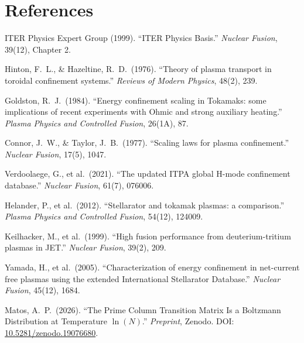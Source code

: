 \documentclass[11pt,letterpaper]{article}
\begin{document}
\section*{References}

\begin{enumerate}[label={[\arabic*]}]
\item ITER Physics Expert Group (1999). ``ITER Physics Basis.'' \textit{Nuclear Fusion}, 39(12), Chapter 2.

\item Hinton, F.~L., \& Hazeltine, R.~D.\ (1976). ``Theory of plasma transport in toroidal confinement systems.'' \textit{Reviews of Modern Physics}, 48(2), 239.

\item Goldston, R.~J.\ (1984). ``Energy confinement scaling in Tokamaks: some implications of recent experiments with Ohmic and strong auxiliary heating.'' \textit{Plasma Physics and Controlled Fusion}, 26(1A), 87.

\item Connor, J.~W., \& Taylor, J.~B.\ (1977). ``Scaling laws for plasma confinement.'' \textit{Nuclear Fusion}, 17(5), 1047.

\item Verdoolaege, G., et al.\ (2021). ``The updated ITPA global H-mode confinement database.'' \textit{Nuclear Fusion}, 61(7), 076006.

\item Helander, P., et al.\ (2012). ``Stellarator and tokamak plasmas: a comparison.'' \textit{Plasma Physics and Controlled Fusion}, 54(12), 124009.

\item Keilhacker, M., et al.\ (1999). ``High fusion performance from deuterium-tritium plasmas in JET.'' \textit{Nuclear Fusion}, 39(2), 209.

\item Yamada, H., et al.\ (2005). ``Characterization of energy confinement in net-current free plasmas using the extended International Stellarator Database.'' \textit{Nuclear Fusion}, 45(12), 1684.

\item Matos, A.~P.\ (2026). ``The Prime Column Transition Matrix Is a Boltzmann Distribution at Temperature $\ln(N)$.'' \textit{Preprint}, Zenodo. DOI: \href{https://doi.org/10.5281/zenodo.19076680}{10.5281/zenodo.19076680}.
\end{enumerate}
\end{document}
